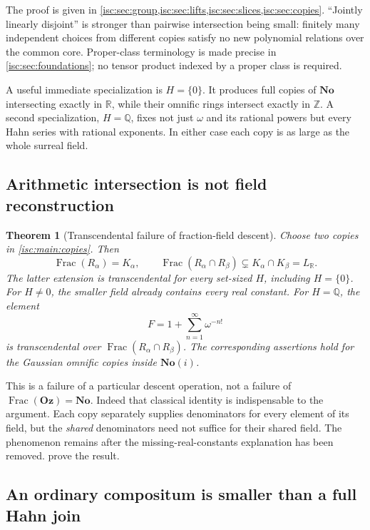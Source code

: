 \documentclass[11pt,letterpaper]{article}
\newtheorem{mainthm}{Theorem}
\theoremstyle{definition}
\theoremstyle{remark}
\newcommand{\No}{\mathbf{No}}
\newcommand{\Oz}{\mathbf{Oz}}
\newcommand{\R}{\mathbb R}
\newcommand{\Q}{\mathbb Q}
\newcommand{\Z}{\mathbb Z}
\newcommand{\Frac}{\operatorname{Frac}}
\numberwithin{equation}{section}
\begin{document}
The proof is given in \cref{isc:sec:group,isc:sec:lifts,isc:sec:slices,isc:sec:copies}.
``Jointly linearly disjoint'' is stronger than pairwise intersection being
small: finitely many independent choices from different copies satisfy no
new polynomial relations over the common core. Proper-class terminology is
made precise in \cref{isc:sec:foundations}; no tensor product indexed by a proper
class is required.

A useful immediate specialization is $H=\{0\}$. It produces full copies of
$\No$ intersecting exactly in $\R$, while their omnific rings intersect
exactly in $\Z$. A second specialization, $H=\Q$, fixes not just $\omega$
and its rational powers but every Hahn series with rational exponents.
In either case each copy is as large as the whole surreal field.

\subsection{Arithmetic intersection is not field reconstruction}

\begin{mainthm}[Transcendental failure of fraction-field descent]\label{isc:main:fractions}
Choose two copies in \cref{isc:main:copies}. Then
\[
 \Frac(R_\alpha)=K_\alpha,\qquad
 \Frac(R_\alpha\cap R_\beta)
 \subsetneq K_\alpha\cap K_\beta=L_\R.
\]
The latter extension is transcendental for every set-sized $H$, including
$H=\{0\}$. For $H\ne0$, the smaller field already contains every real
constant. For $H=\Q$, the element
\[
 F=1+\sum_{n=1}^{\infty}\omega^{-n!}
\]
is transcendental over $\Frac(R_\alpha\cap R_\beta)$.
The corresponding assertions hold for the Gaussian omnific copies inside
$\No(i)$.
\end{mainthm}

This is a failure of a particular descent operation, not a failure of
$\Frac(\Oz)=\No$. Indeed that classical identity is indispensable to the
argument. Each copy separately supplies denominators for every element of
its field, but the \emph{shared} denominators need not suffice for their
shared field. The phenomenon remains after the missing-real-constants
explanation has been removed.  prove the result.

\subsection{An ordinary compositum is smaller than a full Hahn join}
\end{document}
